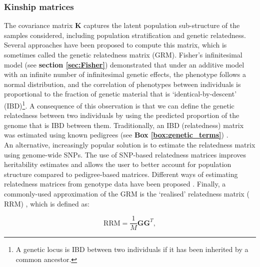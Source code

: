 \subsubsection{Kinship matrices}
\label{sec:kinship_matrices}

The covariance matrix $\mathbf{K}$ captures the latent population sub-structure of the samples considered, including population stratification and genetic relatedness.
Several approaches have been proposed to compute this matrix, which is sometimes called the genetic relatedness matrix (GRM).
Fisher’s infinitesimal model (see \textbf{section \ref{sec:Fisher}}) \cite{fisher1919xv} demonstrated that under an additive model with an infinite number of infinitesimal genetic effects, the phenotype follows a normal distribution, and the correlation of phenotypes between individuals is proportional to the fraction of genetic material that is `identical-by-descent' (IBD)\footnote{A genetic locus is IBD between two individuals if it has been inherited by a common ancestor.}. 
A consequence of this observation is that we can define the genetic relatedness between two individuals by using the predicted proportion of the genome that is IBD between them. 
Traditionally, an IBD (relatedness) matrix was estimated using known pedigrees (see \textbf{Box \ref{box:genetic_terms}}) \cite{lange1976extensions}. 
\\

An alternative, increasingly popular solution is to estimate the relatedness matrix using genome-wide SNPs. 
The use of SNP-based relatedness matrices improves
heritability estimates \cite{visscher2006assumption, visscher2007genome, hayes2009increased} and allows the user to better account for population structure \cite{kang2008efficient, lee2010using} compared to pedigree-based matrices. 
Different ways of estimating relatedness matrices from genotype data have been proposed \cite{oliehoek2006estimating, purcell2007plink, vanraden2008efficient}. 
Finally, a commonly-used approximation of the GRM is the `realised' relatedness matrix ($\mathrm{RRM}$) \cite{hayes2009increased}, which is defined as:

 \begin{equation}
    \mathrm{RRM} = \frac{1}{M}\mathbf{G}\mathbf{G}^T,
\end{equation}

